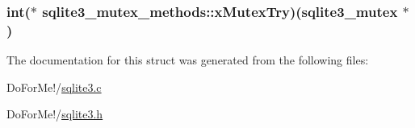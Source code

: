 \hypertarget{structsqlite3__mutex__methods_a45682df41bdfcb267a696090c80ebd06}{
\subsubsection[{x\-Mutex\-Try}]{\setlength{\rightskip}{0pt plus 5cm}int($\ast$ sqlite3\-\_\-mutex\-\_\-methods\-::x\-Mutex\-Try)({\bf sqlite3\-\_\-mutex} $\ast$)}}\label{structsqlite3__mutex__methods_a45682df41bdfcb267a696090c80ebd06}


The documentation for this struct was generated from the following files\-:\begin{DoxyCompactItemize}
\item 
Do\-For\-Me!/\hyperlink{sqlite3_8c}{sqlite3.\-c}\item 
Do\-For\-Me!/\hyperlink{sqlite3_8h}{sqlite3.\-h}\end{DoxyCompactItemize}
